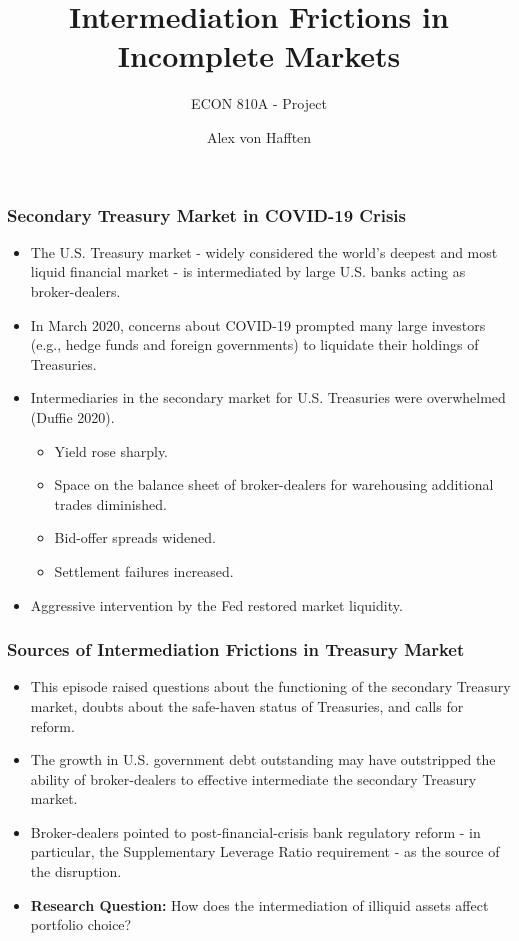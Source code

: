 \documentclass{beamer}
\title[Intermediation Frictions]{Intermediation Frictions in Incomplete Markets}
\subtitle{ECON 810A - Project}
\author{Alex von Hafften}
\institute{UW-Madison}
\begin{document}
\begin{frame}
\titlepage
\end{frame}

\begin{frame}
\frametitle{Secondary Treasury Market in COVID-19 Crisis}
\begin{itemize}[<+->]
\item The U.S. Treasury market - widely considered the world's deepest and most liquid financial market - is intermediated by large U.S. banks acting as broker-dealers.
\bigskip
\item In March 2020, concerns about COVID-19 prompted many large investors (e.g., hedge funds and foreign governments) to liquidate their holdings of Treasuries.
\bigskip
\item Intermediaries in the secondary market for U.S. Treasuries were overwhelmed (Duffie 2020).
\bigskip
\begin{itemize}[<+->]
\item Yield rose sharply.
\item Space on the balance sheet of broker-dealers for warehousing additional trades diminished.
\item Bid-offer spreads widened.
\item Settlement failures increased.
\end{itemize}
\bigskip
\item Aggressive intervention by the Fed restored market liquidity.
\end{itemize}
\end{frame}



\begin{frame}
\frametitle{Sources of Intermediation Frictions in Treasury Market}
\begin{itemize}[<+->]
\item This episode raised questions about the functioning of the secondary Treasury market, doubts about the safe-haven status of Treasuries, and calls for reform.
\bigskip
\item The growth in U.S. government debt outstanding may have outstripped the ability of broker-dealers to effective intermediate the secondary Treasury market.
\bigskip
\item Broker-dealers pointed to post-financial-crisis bank regulatory reform - in particular, the Supplementary Leverage Ratio requirement - as the source of the disruption.
\bigskip
\item \textbf{Research Question:} How does the intermediation of illiquid assets affect portfolio choice?
\end{itemize}
\end{frame}
\end{document}

